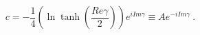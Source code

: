 \begin{equation}
c=-\frac{1}{4}\left(
\ln\tanh(\frac{Re \gamma}{2})\right)
e^{iIm\gamma}\equiv Ae^{-iIm \gamma} \ .
\end{equation}

